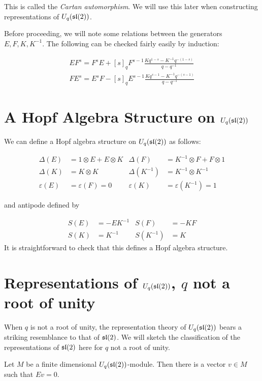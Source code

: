 This is called the \emph{Cartan automorphism}. We will use this later when
constructing representations of $U_q(\mathfrak{sl}(2))$.

Before proceeding, we will note some relations between the generators
$E,F,K,K^{-1}$. The following can be checked fairly easily by induction:

\begin{align}
    \label{EFrelations}
    EF^s = F^sE + [s]_q F^{s-1} \frac{Kq^{1-s} - K^{-1} q^{-(1-s)}}{q-q^{-1}} \\
    FE^s = E^sF - [s]_q E^{s-1} \frac{Kq^{s-1} - K^{-1} q^{-(s-1)}}{q-q^{-1}}
\end{align}

\section{A Hopf Algebra Structure on $U_q(\mathfrak{sl}(2))$}
We can define a Hopf algebra structure on $U_q(\mathfrak{sl}(2))$ as follows:

\begin{align}
    \Delta(E) &= 1 \otimes E + E \otimes K &  \Delta(F) &= K^{-1} \otimes F + F \otimes 1 \\
    \Delta(K) &= K \otimes K &  \Delta(K^{-1}) &= K^{-1} \otimes K^{-1}\\ 
    \varepsilon(E) &= \varepsilon(F) = 0 &  \varepsilon(K) &= \varepsilon(K^{-1}) = 1
\end{align}

and antipode defined by 

\begin{align}
    S(E) &= -EK^{-1} & S(F)      &= -KF \\
    S(K) &= K^{-1}   & S(K^{-1}) &= K 
\end{align}
It is straightforward to check that this defines a Hopf algebra structure. 

\section{Representations of $U_q(\mathfrak{sl}(2))$, $q$ not a root of unity}

When $q$ is not a root of unity, the representation theory of $U_q(\mathfrak{sl}(2))$
bears a striking resemblance to that of $\mathfrak{sl}(2)$. We will sketch the
classification of the representations of $\mathfrak{sl}(2)$ here for $q$ not a root of
unity.

\begin{claim}
    Let $M$ be a finite dimensional $U_q(\mathfrak{sl}(2))$-module. Then there is a
    vector $v \in M$ such that $Ev = 0$. 
\end{claim}

